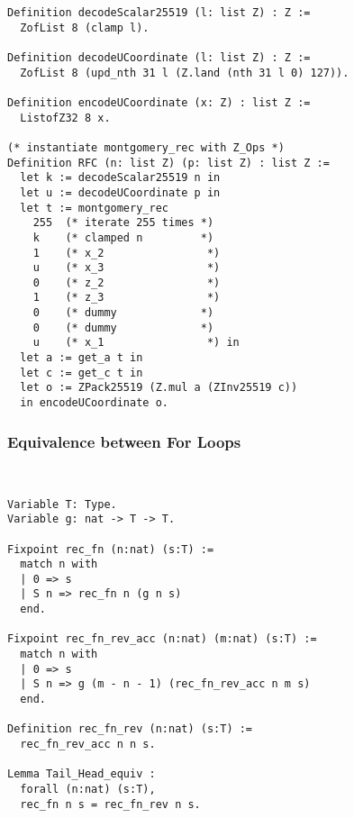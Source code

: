 \begin{lstlisting}[language=Coq]
Definition decodeScalar25519 (l: list Z) : Z :=
  ZofList 8 (clamp l).

Definition decodeUCoordinate (l: list Z) : Z :=
  ZofList 8 (upd_nth 31 l (Z.land (nth 31 l 0) 127)).

Definition encodeUCoordinate (x: Z) : list Z :=
  ListofZ32 8 x.

(* instantiate montgomery_rec with Z_Ops *)
Definition RFC (n: list Z) (p: list Z) : list Z :=
  let k := decodeScalar25519 n in
  let u := decodeUCoordinate p in
  let t := montgomery_rec
    255  (* iterate 255 times *)
    k    (* clamped n         *)
    1    (* x_2                *)
    u    (* x_3                *)
    0    (* z_2                *)
    1    (* z_3                *)
    0    (* dummy             *)
    0    (* dummy             *)
    u    (* x_1                *) in
  let a := get_a t in
  let c := get_c t in
  let o := ZPack25519 (Z.mul a (ZInv25519 c))
  in encodeUCoordinate o.
\end{lstlisting}


\subsubsection{Equivalence between For Loops}
\label{subsubsec:for}
~
\begin{lstlisting}[language=Coq]
Variable T: Type.
Variable g: nat -> T -> T.

Fixpoint rec_fn (n:nat) (s:T) :=
  match n with
  | 0 => s
  | S n => rec_fn n (g n s)
  end.

Fixpoint rec_fn_rev_acc (n:nat) (m:nat) (s:T) :=
  match n with
  | 0 => s
  | S n => g (m - n - 1) (rec_fn_rev_acc n m s)
  end.

Definition rec_fn_rev (n:nat) (s:T) :=
  rec_fn_rev_acc n n s.

Lemma Tail_Head_equiv :
  forall (n:nat) (s:T),
  rec_fn n s = rec_fn_rev n s.
\end{lstlisting}
